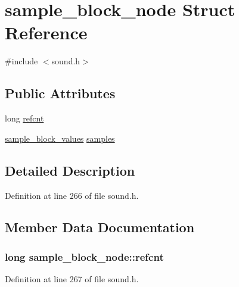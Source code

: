 \hypertarget{structsample__block__node}{}\section{sample\+\_\+block\+\_\+node Struct Reference}
\label{structsample__block__node}


{\ttfamily \#include $<$sound.\+h$>$}

\subsection*{Public Attributes}
\begin{DoxyCompactItemize}
\item 
long \hyperlink{structsample__block__node_aa59f54edaee6c4ab12b5e9eeca2d7699}{refcnt}
\item 
\hyperlink{sound_8h_ac9c43d5cb7db2efe3b154ac6c7c4be05}{sample\+\_\+block\+\_\+values} \hyperlink{structsample__block__node_a921e4cd2359010f8ed736a116da8867e}{samples}
\end{DoxyCompactItemize}


\subsection{Detailed Description}


Definition at line 266 of file sound.\+h.



\subsection{Member Data Documentation}
\subsubsection[{\texorpdfstring{refcnt}{refcnt}}]{\setlength{\rightskip}{0pt plus 5cm}long sample\+\_\+block\+\_\+node\+::refcnt}\hypertarget{structsample__block__node_aa59f54edaee6c4ab12b5e9eeca2d7699}{}\label{structsample__block__node_aa59f54edaee6c4ab12b5e9eeca2d7699}


Definition at line 267 of file sound.\+h.

